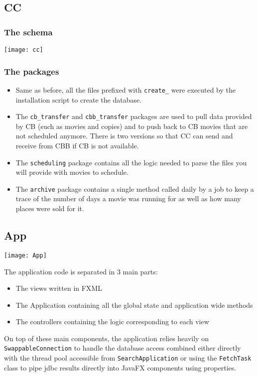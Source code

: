 \documentclass[a4paper]{article}
\begin{document}
\subsection{CC}

\subsubsection{The schema}

\texttt{[image: cc]}

\subsubsection{The packages}

\begin{itemize}
	\item Same as before, all the files prefixed with \texttt{create\_} were executed by the installation script to create the database.
	\item The \texttt{cb\_transfer} and \texttt{cbb\_transfer} packages are used to pull data provided by CB (such as movies and copies) and to push back to CB movies that are not scheduled anymore. There is two versions so that CC can send and receive from CBB if CB is not available.
	\item The \texttt{scheduling} package contains all the logic needed to parse the files you will provide with movies to schedule.
	\item The \texttt{archive} package contains a single method called daily by a job to keep a trace of the number of days a movie was running for as well as how many places were sold for it.
\end{itemize}

\subsection{App}

\texttt{[image: App]}

The application code is separated in 3 main parts:

\begin{itemize}
	\item The views written in FXML
	\item The Application containing all the global state and application wide methods
	\item The controllers containing the logic corresponding to each view
\end{itemize}

On top of these main components, the application relies heavily on \texttt{SwappableConnection} to handle the database access combined either directly with the thread pool accessible from \texttt{SearchApplication} or using the \texttt{FetchTask} class to pipe jdbc results directly into JavaFX components using properties.
\end{document}
